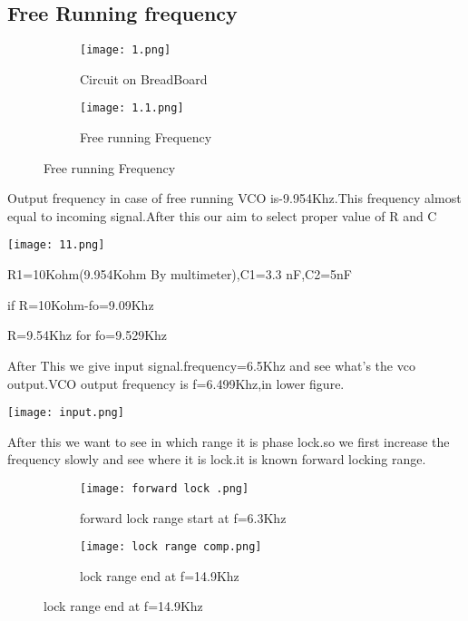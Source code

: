 \documentclass{article}
\begin{document}
\subsection{Free Running frequency}

\begin{figure}[ht]
  \begin{subfigure}[b]{0.5\textwidth}
    \texttt{[image: 1.png]}
    \caption{ Circuit on BreadBoard}
    \label{fig:1}
  \end{subfigure}
  \begin{subfigure}[b]{0.5\textwidth}
    \texttt{[image: 1.1.png]}
    \caption{Free running Frequency}
    \label{fig:2}
  \end{subfigure}
\end{figure}

Output frequency in case of free running VCO is-9.954Khz.This frequency almost equal to incoming signal.After this our aim to select proper value of R and C\par
\begin{figure*}[ht]
	\centering
	\texttt{[image: 11.png]}
	\caption{Equation for calculation of R and C}
	\label{FBD}
\end{figure*}

R1=10Kohm(9.954Kohm By multimeter),C1=3.3 nF,C2=5nF\par 
if R=10Kohm-fo=9.09Khz\par
R=9.54Khz for fo=9.529Khz\par

After This we give input signal.frequency=6.5Khz and see what's the vco output.VCO output frequency is f=6.499Khz,in lower figure.
\begin{figure*}[ht]
	\centering
	\texttt{[image: input.png]}
	\caption{Input at pin-2/and VCO output}
	\label{FBD}
\end{figure*}

After this we want to see in which range it is phase lock.so we first increase the frequency slowly and see where it is lock.it is known forward locking range.

\begin{figure}[h]
  \begin{subfigure}[b]{0.4\textwidth}
    \texttt{[image: forward lock .png]}
    \caption{forward lock range start at f=6.3Khz}
    \label{fig:1}
  \end{subfigure}
  \begin{subfigure}[b]{0.4\textwidth}
    \texttt{[image: lock range comp.png]}
    \caption{lock range end at f=14.9Khz}
    \label{fig:2}
  \end{subfigure}
\end{figure}
\end{document}
